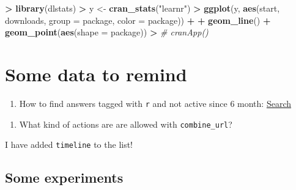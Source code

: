 \documentclass[]{book}
\newenvironment{Shaded}{\begin{snugshade}}{\end{snugshade}}
\newcommand{\KeywordTok}[1]{\textcolor[rgb]{0.13,0.29,0.53}{\textbf{#1}}}
\newcommand{\DataTypeTok}[1]{\textcolor[rgb]{0.13,0.29,0.53}{#1}}
\newcommand{\StringTok}[1]{\textcolor[rgb]{0.31,0.60,0.02}{#1}}
\newcommand{\CommentTok}[1]{\textcolor[rgb]{0.56,0.35,0.01}{\textit{#1}}}
\newcommand{\OperatorTok}[1]{\textcolor[rgb]{0.81,0.36,0.00}{\textbf{#1}}}
\newcommand{\NormalTok}[1]{#1}
\providecommand{\tightlist}{%
  \setlength{\itemsep}{0pt}\setlength{\parskip}{0pt}}
\theoremstyle{definition}
\theoremstyle{definition}
\theoremstyle{definition}
\theoremstyle{remark}
\begin{document}
\begin{Shaded}
\begin{Highlighting}[]
\OperatorTok{>}\StringTok{ }\KeywordTok{library}\NormalTok{(dlstats)}
\OperatorTok{>}\StringTok{ }\NormalTok{y <-}\StringTok{ }\KeywordTok{cran_stats}\NormalTok{(}\StringTok{"learnr"}\NormalTok{)}
\OperatorTok{>}\StringTok{ }\KeywordTok{ggplot}\NormalTok{(y, }\KeywordTok{aes}\NormalTok{(start, downloads, }\DataTypeTok{group =}\NormalTok{ package, }\DataTypeTok{color =}\NormalTok{ package)) }\OperatorTok{+}
\OperatorTok{+}\StringTok{         }\KeywordTok{geom_line}\NormalTok{() }\OperatorTok{+}\StringTok{ }\KeywordTok{geom_point}\NormalTok{(}\KeywordTok{aes}\NormalTok{(}\DataTypeTok{shape =}\NormalTok{ package))}
\OperatorTok{>}\StringTok{ }\CommentTok{# cranApp()}
\end{Highlighting}
\end{Shaded}

\section{Some data to remind}\label{some-data-to-remind}

\begin{enumerate}
\def\labelenumi{\arabic{enumi}.}
\tightlist
\item
  How to find answers tagged with \texttt{r} and not active since 6
  month:
  \href{https://stackoverflow.com/search?q=\%5Br\%5D+lastactive\%3A..6m+is\%3Aa}{Search}
\end{enumerate}

\begin{enumerate}
\def\labelenumi{\arabic{enumi}.}
\setcounter{enumi}{2}
\tightlist
\item
  What kind of actions are are allowed with \texttt{combine\_url}?
\end{enumerate}

I have added \texttt{timeline} to the list!

\subsection{Some experiments}\label{some-experiments}


\end{document}
